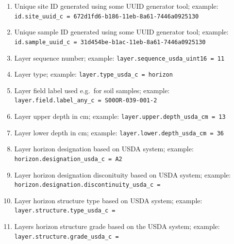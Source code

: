 \documentclass[
  graybox,natbib,nospthms]{svmono}
\providecommand{\tightlist}{%
  \setlength{\itemsep}{0pt}\setlength{\parskip}{0pt}}
\providecommand{\tightlist}{\setlength{\itemsep}{0pt}\setlength{\parskip}{0pt}}
\begin{document}
\begin{enumerate}
\def\labelenumi{\arabic{enumi}.}
\tightlist
\item
  Unique site ID generated using some UUID generator tool; example: \texttt{id.site\_uuid\_c\ =\ \textquotesingle{}672d1fd6-b186-11eb-8a61-7446a0925130\textquotesingle{}}\\
\item
  Unique sample ID generated using some UUID generator tool; example: \texttt{id.sample\_uuid\_c\ =\ \textquotesingle{}31d454be-b1ac-11eb-8a61-7446a0925130\textquotesingle{}}\\
\item
  Layer sequence number; example: \texttt{layer.sequence\_usda\_uint16\ =\ \textquotesingle{}11\textquotesingle{}}\\
\item
  Layer type; example: \texttt{layer.type\_usda\_c\ =\ \textquotesingle{}horizon\textquotesingle{}}\\
\item
  Layer field label used e.g.~for soil samples; example: \texttt{layer.field.label\_any\_c\ =\ \textquotesingle{}S00OR-039-001-2\textquotesingle{}}\\
\item
  Layer upper depth in cm; example: \texttt{layer.upper.depth\_usda\_cm\ =\ \textquotesingle{}13\textquotesingle{}}\\
\item
  Layer lower depth in cm; example: \texttt{layer.lower.depth\_usda\_cm\ =\ \textquotesingle{}36\textquotesingle{}}\\
\item
  Layer horizon designation based on USDA system; example: \texttt{horizon.designation\_usda\_c\ =\ \textquotesingle{}A2\textquotesingle{}}\\
\item
  Layer horizon designation disconituity based on USDA system; example: \texttt{horizon.designation.discontinuity\_usda\_c\ =\ \textquotesingle{}\textquotesingle{}}\\
\item
  Layer horizon structure type based on USDA system; example: \texttt{layer.structure.type\_usda\_c\ =\ \textquotesingle{}\textquotesingle{}}\\
\item
  Layers horizon structure grade based on the USDA system; example: \texttt{layer.structure.grade\_usda\_c\ =\ \textquotesingle{}\textquotesingle{}}\\

\end{enumerate}
\end{document}
